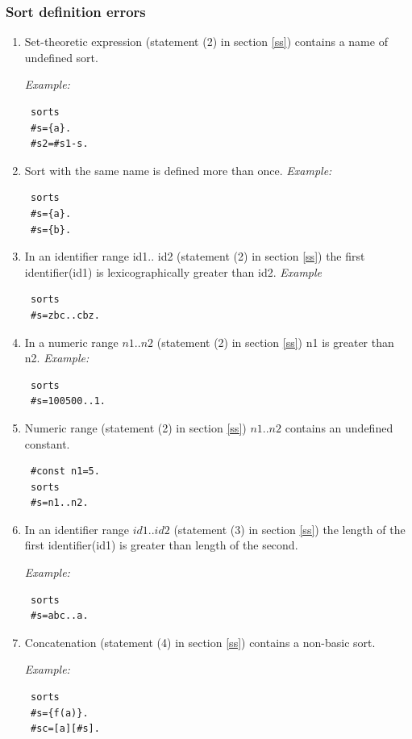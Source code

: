 \documentclass[12pt, letterpaper]{article}
\begin{document}
\subsubsection{Sort definition errors}
\begin{enumerate}
\item  Set-theoretic expression (statement (2) in section \ref{ss}) contains a name of undefined sort.

\textit{Example:}
\begin{verbatim}
 sorts
 #s={a}.
 #s2=#s1-s.
\end{verbatim}

\item  Sort with the same name is defined more than once.
\textit{Example:}
\begin{verbatim}
 sorts
 #s={a}.
 #s={b}.
\end{verbatim}


\item In an identifier range id1.. id2 (statement (2) in section \ref{ss}) the first identifier(id1) is lexicographically greater than id2.
\textit{Example}
\begin{verbatim}
 sorts
 #s=zbc..cbz.
\end{verbatim}

\item In a numeric range $n1..n2$ (statement (2) in section \ref{ss})  n1 is greater than n2.
\textit{Example:}
\begin{verbatim}
 sorts
 #s=100500..1.
\end{verbatim}


\item Numeric range (statement (2) in section \ref{ss}) $n1..n2$  contains an undefined constant.

\begin{verbatim}
 #const n1=5.
 sorts
 #s=n1..n2.
\end{verbatim}

\item In an identifier range $id1..id2$ (statement (3) in section \ref{ss})  the length of the first identifier(id1) is greater than length of the second. 


\textit{Example:}
\begin{verbatim}
 sorts
 #s=abc..a.
\end{verbatim}

\item Concatenation (statement  (4) in section \ref{ss}) contains a non-basic sort.

\textit{Example:}
\begin{verbatim}
 sorts
 #s={f(a)}.
 #sc=[a][#s].
\end{verbatim}




\end{enumerate}
\end{document}
